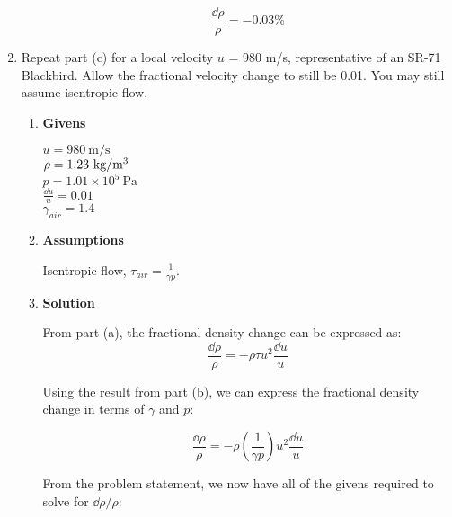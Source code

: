 \documentclass[12pt,letterpaper]{article}
\begin{document}
\begin{enumerate}[label=(\alph*)]
\begin{enumerate}[label=\arabic*.]
			\begin{equation*}
				\boxed{\frac{\dd \rho}{\rho} = -0.03\%}
			\end{equation*}
			
		\end{enumerate}

		\item Repeat part (c) for a local velocity $u$ = 980 m/s, representative of an SR-71 Blackbird. Allow the fractional velocity change to still be 0.01. You may still assume isentropic flow. 
		
		\begin{enumerate}[label=\arabic*.]
			
			\item{\textbf{Givens}} \\
			$u = 980 \ \textrm{m/s}$\\
			$\rho = 1.23 \ \mathrm{kg/m\textsuperscript{3}}$\\
			$p = 1.01 \times 10^5 \  \mathrm{Pa}$\\
			$\frac{\dd u}{u} = 0.01$\\
			$\gamma_{air} = 1.4$\\
			
			\item{\textbf{Assumptions}} \\
			Isentropic flow, $\tau_{air} = \frac{1}{\gamma p}$.
			
			\item{\textbf{Solution}} \\
			From part (a), the fractional density change can be expressed as:
			\begin{equation*}
				\frac{\dd \rho}{\rho} = - \rho \tau u^2 \frac{\dd u}{u}
			\end{equation*}
			
			Using the result from part (b), we can express the fractional density change in terms of $\gamma$ and $p$:
			
			\begin{equation*}
				\frac{\dd \rho}{\rho} = - \rho \left( \frac{1}{\gamma p} \right) u^2 \frac{\dd u}{u}
			\end{equation*}
			
			From the problem statement, we now have all of the givens required to solve for $\dd \rho / \rho$:
			

\end{enumerate}
\end{enumerate}
\end{document}
